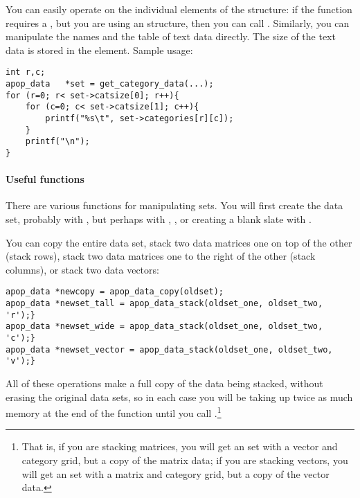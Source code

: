 You can easily operate on the individual elements of the structure:
if the  function requires a
, but you are using an 
structure, then you can call
. Similarly, you
can
manipulate the names and the table of text data directly. The size of the text
data is stored in the  element. Sample usage:

\begin{lstlisting}
int r,c;
apop_data   *set = get_category_data(...);
for (r=0; r< set->catsize[0]; r++){
    for (c=0; c< set->catsize[1]; c++){
        printf("%s\t", set->categories[r][c]);
    }
    printf("\n");
}
\end{lstlisting}



\paragraph{Useful functions} There are
various functions for manipulating  sets. You will
first
create the data set, probably with , but perhaps
with , , or
creating a blank slate with .

You can copy the entire data set, 
stack two data matrices one on top of the other (stack rows), 
stack two data matrices one to the right of the other (stack columns),
or stack two data vectors:
\begin{lstlisting}
apop_data *newcopy = apop_data_copy(oldset);
apop_data *newset_tall = apop_data_stack(oldset_one, oldset_two, 'r');}
apop_data *newset_wide = apop_data_stack(oldset_one, oldset_two, 'c');}
apop_data *newset_vector = apop_data_stack(oldset_one, oldset_two, 'v');}
\end{lstlisting}

All of these operations make a full copy of the data being stacked, without
erasing the original data sets, so in each case
you will be taking up twice as much memory
at the end of the function until you call
.\footnote{That is, 
if you are stacking matrices, you will get an  set with a
 vector and category grid, but a copy of the matrix data; 
if you are stacking vectors, you will get an  set with a
 matrix and category grid, but a copy of the vector 
data.} 

